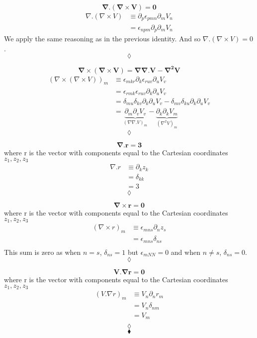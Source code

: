 $$ \mathbf{\nabla . \left(\nabla\times V \right)= 0}$$
\begin{align}
\nabla . \left(\nabla\times V \right)&\equiv \partial_p\epsilon_{pmn} \partial_mV_n\\
&=\epsilon_{npm} \partial_p \partial_m V_n
\end{align}
We apply the same reasoning as in the previous identity. And so $\nabla . \left(\nabla\times V \right) = 0$.
$$\lozenge$$

$$ \mathbf{\nabla \times \left(\nabla\times V \right)= \nabla\nabla.V-\nabla^2V}$$
\begin{align}
\left(\nabla \times \left(\nabla\times V \right)\right)_m&\equiv \epsilon_{mkr} \partial_k \epsilon_{ruv} \partial_uV_v\\
&=\epsilon_{rmk} \epsilon_{ruv}\partial_k  \partial_u V_v\\
&=\delta_{mu}\delta_{kv}\partial_k  \partial_u V_v-\delta_{mv}\delta_{ku}\partial_k  \partial_u V_v\\
&=\underbrace{\partial_m  \partial_v V_v}_{\left(\nabla\nabla.V\right)_m}-\underbrace{\partial_k  \partial_k V_m}_{\left(\nabla^2 V\right)_m}
\end{align}
$$\lozenge$$

$$ \mathbf{\nabla .r= 3}$$
where r is the vector with components equal to the Cartesian coordinates $z_1,z_2,z_3$
\begin{align}
\nabla .r &\equiv \partial_k z_k\\
&=\delta_{kk}\\
&=3
\end{align}
$$\lozenge$$

$$ \mathbf{\nabla \times r= 0}$$
where r is the vector with components equal to the Cartesian coordinates $z_1,z_2,z_3$
\begin{align}
\left(\nabla \times r\right)_m &\equiv \epsilon_{mns}\partial_n z_s\\
&=\epsilon_{mns}\delta_{ns}\\
\end{align}
This sum is zero as when $n=s$, $\delta_{ns}=1$ but $\epsilon_{mNN}=0$ and when $n\ne s$, $\delta_{ns}=0$.
$$\lozenge$$

$$ \mathbf{V .\nabla r= 0}$$
where r is the vector with components equal to the Cartesian coordinates $z_1,z_2,z_3$
\begin{align}
\left(V .\nabla r\right)_m &\equiv V_n \partial_n r_m\\
&=V_n \delta_{nm}\\
&=V_m\\
\end{align}
$$\lozenge$$
$$\blacklozenge$$
\newpage

